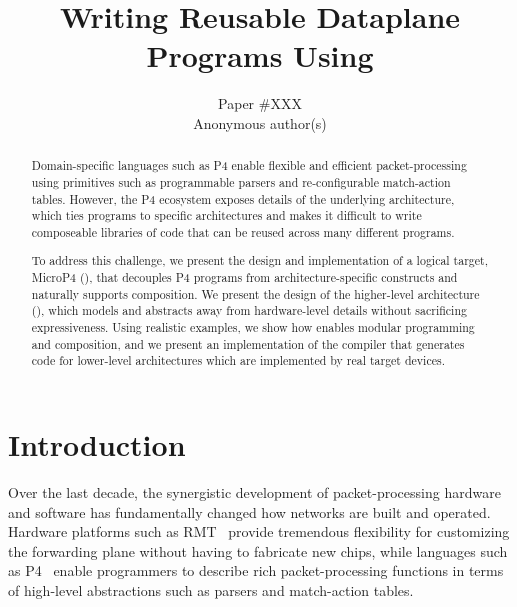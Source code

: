 \documentclass[letterpaper,twocolumn,10pt]{article}
\begin{document}
\date{}
\title{\Large \bf Writing Reusable Dataplane Programs Using \ulang}
\author{{\rm Paper \#XXX}\\ Anonymous author(s)}
\maketitle

\begin{abstract}
Domain-specific languages such as P4 enable flexible and efficient
packet-processing using primitives such as programmable parsers and
re-configurable match-action tables. However, the P4 ecosystem exposes
details of the underlying architecture, which ties programs to
specific architectures and makes it difficult to write composeable
libraries of code that can be reused across many different programs.

To address this challenge, we present the design and implementation of
a logical target, MicroP4 (\uswitch), that decouples P4 programs from
architecture-specific constructs and naturally supports composition.
We present the design of the higher-level architecture (\uarch),
which models \uswitch and abstracts away from hardware-level details without sacrificing
expressiveness. Using realistic examples, we show how \uswitch enables
modular programming and composition, and we present an implementation
of the \ucomp compiler that generates code for lower-level
architectures which are implemented by real target devices.
\end{abstract}



\section{Introduction}
\label{sec:intro}
Over the last decade, the synergistic development of packet-processing
hardware and software has fundamentally changed how networks are built
and operated. Hardware platforms such as
RMT~\cite{bosshart2013forwarding} provide tremendous flexibility for
customizing the forwarding plane without having to fabricate new
chips, while languages such as P4~\cite{bosshart2014p4, p4lang} enable
programmers to describe rich packet-processing functions in terms of
high-level abstractions such as parsers and match-action tables.
\end{document}
